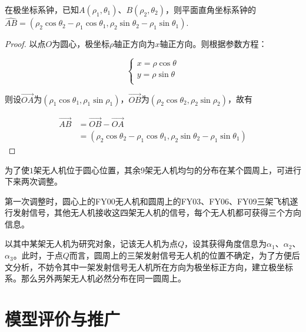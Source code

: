 \begin{mythm}
    在极坐标系钟，已知$A(\rho_1, \theta_1)$、$B(\rho_2, \theta_2)$，则平面直角坐标系钟的$\widehat{AB}=(\rho_2\cos\theta_2 - \rho_1\cos\theta_1, \rho_2\sin\theta_2 - \rho_1\sin\theta_1)$.
\end{mythm}

\begin{proof}
    以点$O$为圆心，极坐标$\rho$轴正方向为$x$轴正方向。则根据参数方程：

    \begin{equation*}
        \begin{cases}
            x = \rho\cos\theta\\
            y = \rho\sin\theta\\
        \end{cases}
    \end{equation*}

    则设$\overrightarrow{OA}$为$(\rho_1\cos\theta_1, \rho_1\sin\rho_1)$，$\overrightarrow{OB}$为$(\rho_2\cos\theta_2, \rho_2\sin\rho_2)$，故有

    \begin{equation}
        \begin{aligned}
            \overrightarrow{AB} &= \overrightarrow{OB} - \overrightarrow{OA} \\
            &=(\rho_2\cos\theta_2 - \rho_1\cos\theta_1, \rho_2\sin\theta_2 - \rho_1\sin\theta_1)
        \end{aligned}
    \end{equation}
\end{proof}

为了使$1$架无人机位于圆心位置，其余$9$架无人机均匀的分布在某个圆周上，可进行下来两次调整。

第一次调整时，圆心上的FY00无人机和圆周上的FY03、FY06、FY09三架飞机遂行发射信号，其他无人机接收这四架无人机的信号，每个无人机都可获得三个方向信息。

以其中某架无人机为研究对象，记该无人机为点$Q$，设其获得角度信息为$\alpha_1$、$\alpha_2$、$\alpha_3$。此时，于点$Q$而言，圆周上的三架发射信号无人机的位置不确定，为了方便后文分析，不妨令其中一架发射信号无人机所在方向为极坐标正方向，建立极坐标系。那么另外两架无人机必然分布在同一圆周上。





\section{模型评价与推广}

